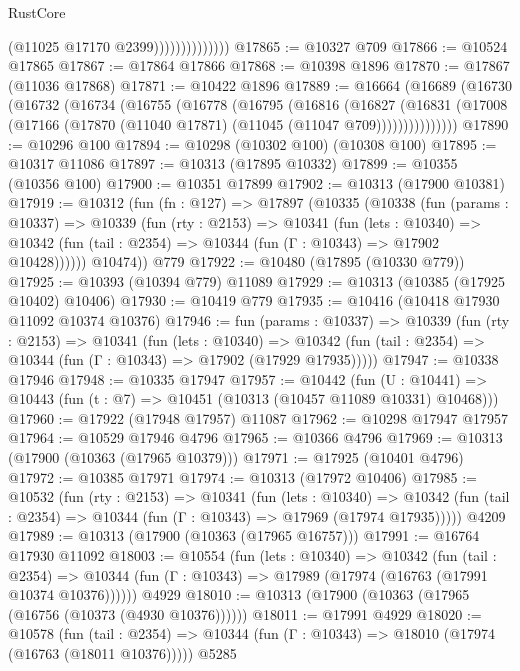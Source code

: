 \begin{lexlean}{RustCore}
\begin{coremodule}
                              (@11025 @17170 @2399))))))))))))))
@17865 := @10327 @709
@17866 := @10524 @17865
@17867 := @17864 @17866
@17868 := @10398 @1896
@17870 := @17867 (@11036 @17868)
@17871 := @10422 @1896
@17889 := @16664
    (@16689
      (@16730
        (@16732
          (@16734
            (@16755
              (@16778
                (@16795
                  (@16816
                    (@16827
                      (@16831
                        (@17008 (@17166 (@17870 (@11040 @17871) (@11045 (@11047 @709)))))))))))))))
@17890 := @10296 @100
@17894 := @10298 (@10302 @100) (@10308 @100)
@17895 := @10317 @11086
@17897 := @10313 (@17895 @10332)
@17899 := @10355 (@10356 @100)
@17900 := @10351 @17899
@17902 := @10313 (@17900 @10381)
@17919 := @10312
    (fun (fn : @127) =>
    @17897
      (@10335
        (@10338
          (fun (params : @10337) =>
          @10339
            (fun (rty : @2153) =>
            @10341
              (fun (lets : @10340) =>
              @10342 (fun (tail : @2354) => @10344 (fun (Γ : @10343) => @17902 @10428))))))
        @10474))
    @779
@17922 := @10480 (@17895 (@10330 @779))
@17925 := @10393 (@10394 @779) @11089
@17929 := @10313 (@10385 (@17925 @10402) @10406)
@17930 := @10419 @779
@17935 := @10416 (@10418 @17930 @11092 @10374 @10376)
@17946 := fun (params : @10337) =>
  @10339
    (fun (rty : @2153) =>
    @10341
      (fun (lets : @10340) =>
      @10342 (fun (tail : @2354) => @10344 (fun (Γ : @10343) => @17902 (@17929 @17935)))))
@17947 := @10338 @17946
@17948 := @10335 @17947
@17957 := @10442
    (fun (U : @10441) => @10443 (fun (t : @7) => @10451 (@10313 (@10457 @11089 @10331) @10468)))
@17960 := @17922 (@17948 @17957) @11087
@17962 := @10298 @17947 @17957
@17964 := @10529 @17946 @4796
@17965 := @10366 @4796
@17969 := @10313 (@17900 (@10363 (@17965 @10379)))
@17971 := @17925 (@10401 @4796)
@17972 := @10385 @17971
@17974 := @10313 (@17972 @10406)
@17985 := @10532
    (fun (rty : @2153) =>
    @10341
      (fun (lets : @10340) =>
      @10342 (fun (tail : @2354) => @10344 (fun (Γ : @10343) => @17969 (@17974 @17935)))))
    @4209
@17989 := @10313 (@17900 (@10363 (@17965 @16757)))
@17991 := @16764 @17930 @11092
@18003 := @10554
    (fun (lets : @10340) =>
    @10342
      (fun (tail : @2354) =>
      @10344 (fun (Γ : @10343) => @17989 (@17974 (@16763 (@17991 @10374 @10376))))))
    @4929
@18010 := @10313 (@17900 (@10363 (@17965 (@16756 (@10373 (@4930 @10376))))))
@18011 := @17991 @4929
@18020 := @10578
    (fun (tail : @2354) => @10344 (fun (Γ : @10343) => @18010 (@17974 (@16763 (@18011 @10376)))))
    @5285

\end{coremodule}
\end{lexlean}
